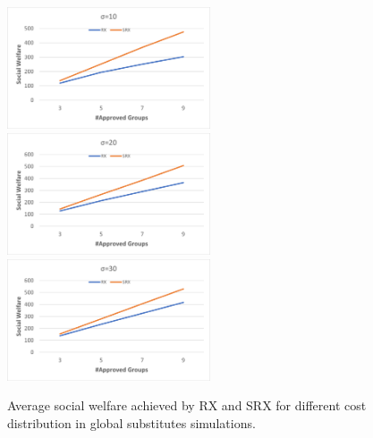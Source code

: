 \documentclass[runningheads]{llncs}
\begin{document}
\begin{subappendices}
\begin{figure}[t]
\begin{center}
\includegraphics[width=6cm]{simulation/constant_substitutes_sw_10.png}
\includegraphics[width=6cm]{simulation/constant_substitutes_sw_20.png}
\includegraphics[width=6cm]{simulation/constant_substitutes_sw_30.png}
\caption{Average social welfare achieved by RX and SRX for different cost distribution in global substitutes simulations.
}\label{fig:sw_all2}
\end{center}
\end{figure}



\end{subappendices}
\end{document}
